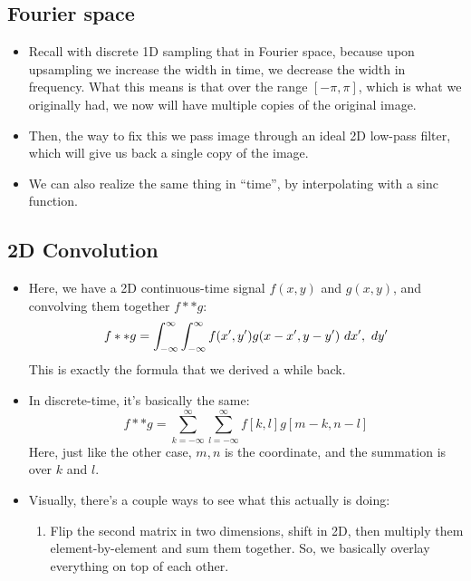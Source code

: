 \subsection{Fourier space} 
\begin{itemize}
	\item Recall with discrete 1D sampling that in Fourier space, because upon upsampling we increase the 
		width in time, we decrease the width in frequency. What this means is that over the range 
		\( [-\pi, \pi] \), which is what we originally had, we now will have multiple copies of the 
		original image. 
	\item Then, the way to fix this we pass image through an ideal 2D low-pass filter, which will give us back 
		a single copy of the image. 
	\item We can also realize the same thing in ``time'', by interpolating with a sinc function. 
\end{itemize}
\subsection{2D Convolution} 
\begin{itemize}
	\item Here, we have a 2D continuous-time signal \( f(x, y) \) and \( g(x, y) \), and convolving them together 
		\( f * * g \):
		\[
		f * * g = \int_{-\infty}^{\infty} \int_{-\infty}^{\infty} f(x', y') g(x - x', y - y') \ d x', \ d y'  
		\] 
		This is exactly the formula that we derived a while back.   
	\item In discrete-time, it's basically the same:
		\[
			f * * g = \sum_{k=-\infty}^{\infty} \sum_{l=-\infty}^{\infty} f[k, l] g[m - k, n - l] 
		\] 
		Here, just like the other case, \( m, n \) is the coordinate, and the summation is over \( k \) and \( l \). 
	\item Visually, there's a couple ways to see what this actually is doing:
		\begin{enumerate}[label=\arabic*.]
			\item Flip the second matrix in two dimensions, shift in 2D, then multiply them element-by-element 
				and sum them together. So, we basically overlay everything on top of each other.  
		\end{enumerate}
\end{itemize}
